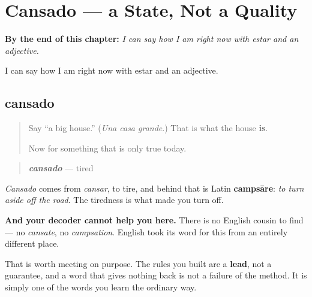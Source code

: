 
\chapter{Cansado --- a State, Not a Quality}
\label{ch:cansado}

\begin{chapteropening}
\textbf{By the end of this chapter:} \emph{I can say how I am right now with estar and an adjective.}

I can say how I am right now with estar and an adjective.
\end{chapteropening}

\section[cansado]{cansado}

\label{lesson:ES-C09-cansado}



\begin{quote}
Say \textquotedblleft{}a big house.\textquotedblright{} (\emph{Una casa grande}.) That is what the house \textbf{is}.

Now for something that is only true today.
\end{quote}

\begin{cousinweb}
\begin{quote}
\emph{\textbf{cansado}} — tired
\end{quote}

\emph{Cansado} comes from \emph{cansar}, to tire, and behind that is Latin \textbf{campsāre}: \emph{to turn aside off the road}. The tiredness is what made you turn off.

\textbf{And your decoder cannot help you here.} There is no English cousin to find — no \emph{cansate}, no \emph{campsation}. English took its word for this from an entirely different place.

That is worth meeting on purpose. The rules you built are a \textbf{lead}, not a guarantee, and a word that gives nothing back is not a failure of the method. It is simply one of the words you learn the ordinary way.
\end{cousinweb}

